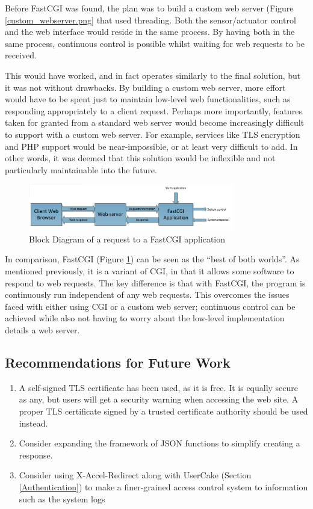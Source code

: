 Before FastCGI was found, the plan was to build a custom web server (Figure \ref{custom_webserver.png} that used threading. Both the sensor/actuator control and the web interface would reside in the same process. By having both in the same process, continuous control is possible whilst waiting for web requests to be received.

This would have worked, and in fact operates similarly to the final solution, but it was not without drawbacks. By building a custom web server, more effort would have to be spent just to maintain low-level web functionalities, such as responding appropriately to a client request. Perhaps more importantly, features taken for granted from a standard web server would become increasingly difficult to support with a custom web server. For example, services like TLS encryption and PHP support would be near-impossible, or at least very difficult to add. In other words, it was deemed that this solution would be inflexible and not particularly maintainable into the future.

\begin{figure}[H]
	\centering
	\includegraphics[width=0.8\textwidth]{figures/fastcgi.png}
	\caption{Block Diagram of a request to a FastCGI application} 
	\label{fastcgi.png}
\end{figure}

In comparison, FastCGI (Figure \ref{fastcgi.png}) can be seen as the ``best of both worlds''. As mentioned previously, it is a variant of CGI, in that it allows some software to respond to web requests. The key difference is that with FastCGI, the program is continuously run independent of any web requests. This overcomes the issues faced with either using CGI or a custom web server; continuous control can be achieved while also not having to worry about the low-level implementation details a web server.



\subsection{Recommendations for Future Work}

\begin{enumerate}
	\item A self-signed TLS certificate has been used, as it is free. It is equally secure as any, but users will get a security warning when accessing the web site. A proper TLS certificate signed by a trusted certificate authority should be used instead.
	\item Consider expanding the framework of JSON functions to simplify creating a response. 
	\item Consider using X-Accel-Redirect along with UserCake (Section \ref{Authentication}) to make a finer-grained access control system to information such as the system logs
\end{enumerate}

